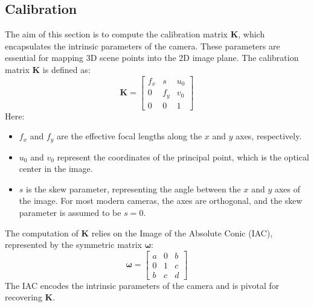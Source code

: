 \documentclass{Academic}
\begin{document}
\subsection{Calibration}
The aim of this section is to compute the calibration matrix $\mathbf{K}$, which encapsulates the intrinsic parameters of the camera. 
These parameters are essential for mapping 3D scene points into the 2D image plane. 
The calibration matrix $\mathbf{K}$ is defined as:
\begin{equation}\mathbf{K} = \begin{bmatrix} f_x & s & u_0 \\ 0 & f_y & v_0 \\ 0 & 0 & 1 \end{bmatrix}\end{equation}
Here: 
\begin{itemize}
    \item $f_x$ and $f_y$ are the effective focal lengths along the $x$ and $y$ axes, respectively.
    \item $u_0$ and $v_0$ represent the coordinates of the principal point, which is the optical center in the image.
    \item $s$ is the skew parameter, representing the angle between the $x$ and $y$ axes of the image. 
        For most modern cameras, the axes are orthogonal, and the skew parameter is assumed to be $s = 0$.
\end{itemize}

The computation of $\mathbf{K}$ relies on the Image of the Absolute Conic (IAC), represented by the symmetric matrix $\boldsymbol{\omega}$:
\begin{equation} \label{eqn:iac} \boldsymbol{\omega} = \begin{bmatrix} a & 0 & b \\ 0 & 1 & c \\ b & c & d \end{bmatrix}\end{equation}
The IAC encodes the intrinsic parameters of the camera and is pivotal for recovering $\mathbf{K}$.
\end{document}
